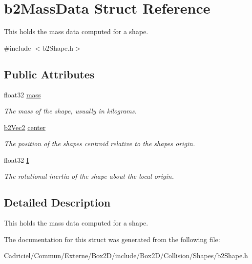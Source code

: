 \hypertarget{structb2_mass_data}{}\section{b2\+Mass\+Data Struct Reference}
\label{structb2_mass_data}


This holds the mass data computed for a shape.  




{\ttfamily \#include $<$b2\+Shape.\+h$>$}

\subsection*{Public Attributes}
\begin{DoxyCompactItemize}
\item 
float32 \hyperlink{structb2_mass_data_aea85d9595a38d2eed05b8d2ea80d97b1}{mass}\hypertarget{structb2_mass_data_aea85d9595a38d2eed05b8d2ea80d97b1}{}\label{structb2_mass_data_aea85d9595a38d2eed05b8d2ea80d97b1}

\begin{DoxyCompactList}\small\item\em The mass of the shape, usually in kilograms. \end{DoxyCompactList}\item 
\hyperlink{structb2_vec2}{b2\+Vec2} \hyperlink{structb2_mass_data_a1d59bebc7030c4dded0c2febc57ebdd7}{center}\hypertarget{structb2_mass_data_a1d59bebc7030c4dded0c2febc57ebdd7}{}\label{structb2_mass_data_a1d59bebc7030c4dded0c2febc57ebdd7}

\begin{DoxyCompactList}\small\item\em The position of the shape\textquotesingle{}s centroid relative to the shape\textquotesingle{}s origin. \end{DoxyCompactList}\item 
float32 \hyperlink{structb2_mass_data_ad2d06e96e2d79d895df16ae0e5fe0376}{I}\hypertarget{structb2_mass_data_ad2d06e96e2d79d895df16ae0e5fe0376}{}\label{structb2_mass_data_ad2d06e96e2d79d895df16ae0e5fe0376}

\begin{DoxyCompactList}\small\item\em The rotational inertia of the shape about the local origin. \end{DoxyCompactList}\end{DoxyCompactItemize}


\subsection{Detailed Description}
This holds the mass data computed for a shape. 

The documentation for this struct was generated from the following file\+:\begin{DoxyCompactItemize}
\item 
Cadriciel/\+Commun/\+Externe/\+Box2\+D/include/\+Box2\+D/\+Collision/\+Shapes/b2\+Shape.\+h\end{DoxyCompactItemize}
